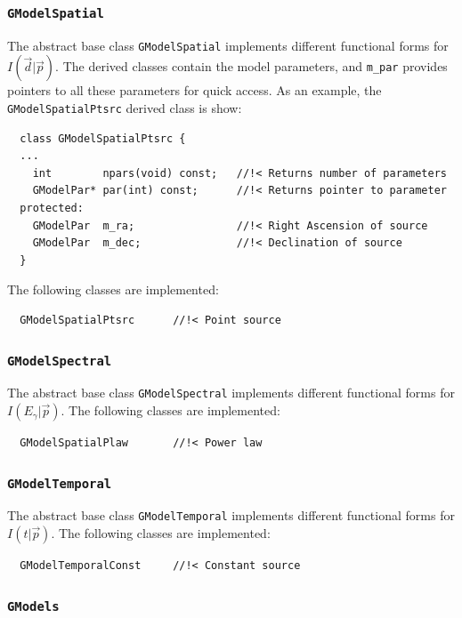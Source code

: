 \documentclass{article}[12pt,a4]
\begin{document}
\subsubsection{{\tt GModelSpatial}}

The abstract base class {\tt GModelSpatial} implements different functional forms for 
$I(\vec{d} | \vec{p})$.
The derived classes contain the model parameters, and {\tt m\_par} provides pointers
to all these parameters for quick access.
As an example, the {\tt GModelSpatialPtsrc} derived class is show:
\begin{verbatim}
  class GModelSpatialPtsrc {
  ...
    int        npars(void) const;   //!< Returns number of parameters
    GModelPar* par(int) const;      //!< Returns pointer to parameter
  protected:
    GModelPar  m_ra;                //!< Right Ascension of source
    GModelPar  m_dec;               //!< Declination of source
  }
\end{verbatim}
The following classes are implemented:
\begin{verbatim}
  GModelSpatialPtsrc      //!< Point source
\end{verbatim}


\subsubsection{{\tt GModelSpectral}}

The abstract base class {\tt GModelSpectral} implements different functional forms for 
$I(E_{\gamma} | \vec{p})$.
The following classes are implemented:
\begin{verbatim}
  GModelSpatialPlaw       //!< Power law
\end{verbatim}


\subsubsection{{\tt GModelTemporal}}

The abstract base class {\tt GModelTemporal} implements different functional forms for 
$I(t | \vec{p})$.
The following classes are implemented:
\begin{verbatim}
  GModelTemporalConst     //!< Constant source
\end{verbatim}


\subsubsection{{\tt GModels}}
\end{document}
